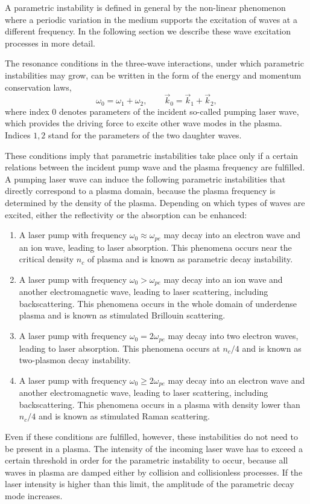 A parametric instability is defined in general by the non-linear phenomenon where a periodic variation in the medium supports the excitation of waves at a different frequency. In the following section we describe these wave excitation processes in more detail.

The resonance conditions in the three-wave interactions, under which parametric instabilities may grow, can be written in the form of the energy and momentum conservation laws,
\begin{equation}
\label{2.5.2.1}
\omega_0 = \omega_1 + \omega_2, \qquad \vec{k}_0 = \vec{k}_1 + \vec{k}_2,
\end{equation}
where index $ 0 $ denotes parameters of the incident so-called pumping laser wave, which provides the driving force to excite other wave modes in the plasma. Indices $ 1, 2 $ stand for the parameters of the two daughter waves.

These conditions imply that parametric instabilities take place only if a certain relations between the incident pump wave and the plasma frequency are fulfilled. A pumping laser wave can induce the following parametric instabilities that directly correspond to a plasma domain, because the plasma frequency is determined by the density of the plasma. Depending on which types of waves are excited, either the reflectivity or the absorption can be enhanced:
\begin{enumerate}[nolistsep, topsep=5pt]
\item A laser pump with frequency $ \omega_0 \approx \omega_{pe} $ may decay into an electron wave and an ion wave, leading to laser absorption. This phenomena occurs near the critical density $ n_c $ of plasma and is known as parametric decay instability.
\item A laser pump with frequency $ \omega_0 > \omega_{pe} $ may decay into an ion wave and another electromagnetic wave, leading to laser scattering, including backscattering. This phenomena occurs in the whole domain of underdense plasma and is known as stimulated Brillouin scattering.
\item A laser pump with frequency $ \omega_0 = 2 \omega_{pe} $ may decay into two electron waves, leading to laser absorption. This phenomena occurs at $ n_c/4 $ and is known as two-plasmon decay instability.
\item A laser pump with frequency $ \omega_0 \geq 2 \omega_{pe} $ may decay into an electron wave and another electromagnetic wave, leading to laser scattering, including backscattering. This phenomena occurs in a plasma with density lower than $ n_c/4 $ and is known as stimulated Raman scattering.
\end{enumerate}

Even if these conditions are fulfilled, however, these instabilities do not need to be present in a plasma. The intensity of the incoming laser wave has to exceed a certain threshold in order for the parametric instability to occur, because all waves in plasma are damped either by collision and collisionless processes. If the laser intensity is higher than this limit, the amplitude of the parametric decay mode increases.